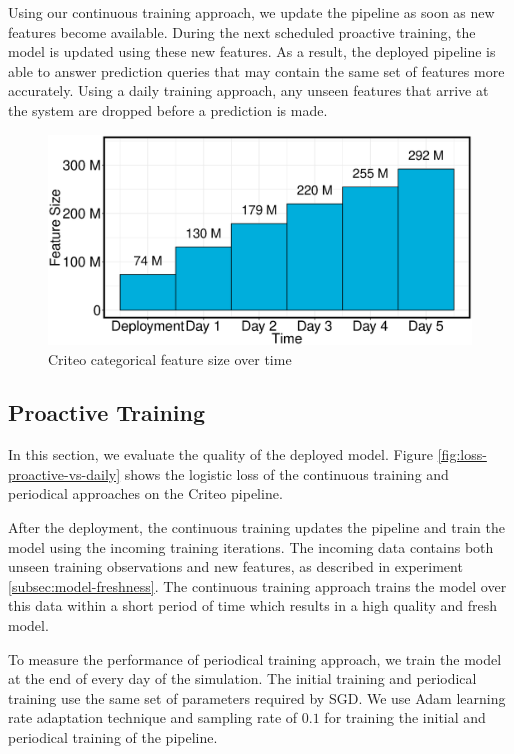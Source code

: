 Using our continuous training approach, we update the pipeline as soon as new features become available.
During the next scheduled proactive training, the model is updated using these new features.
As a result, the deployed pipeline is able to answer prediction queries that may contain the same set of features more accurately.
Using a daily training approach, any unseen features that arrive at the system are dropped before a prediction is made.

\begin{figure}[H]
\includegraphics[width=\columnwidth]{../images/experiment-results/criteo-feature-discovery-experiment.eps}
\caption{Criteo categorical feature size over time}
\label{fig:criteo-feature-discovery}
\end{figure}


\subsection{Proactive Training}
In this section, we evaluate the quality of the deployed model.
Figure \ref{fig:loss-proactive-vs-daily} shows the logistic loss of the continuous training and periodical approaches on the Criteo pipeline.

After the deployment, the continuous training updates the pipeline and train the model using the incoming training iterations.
The incoming data contains both unseen training observations and new features, as described in experiment \ref{subsec:model-freshness}.
The continuous training approach trains the model over this data within a short period of time which results in a high quality and fresh model.

To measure the performance of periodical training approach, we train the model at the end of every day of the simulation.
The initial training and periodical training use the same set of parameters required by SGD.
We use Adam learning rate adaptation technique and sampling rate of $0.1$ for training the initial and periodical training of the pipeline.

